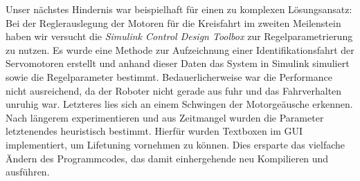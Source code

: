 \documentclass[12pt,a4paper,oneside]{article}
\begin{document}
\begin{spacing}{1.15}
	Unser nächstes Hindernis war beispielhaft für einen zu komplexen Lösungsansatz: Bei der Reglerauslegung der Motoren für die Kreisfahrt im zweiten Meilenstein haben wir versucht die \textit{Simulink Control Design Toolbox} zur Regelparametrierung zu nutzen. Es wurde eine Methode zur Aufzeichnung einer Identifikationsfahrt der Servomotoren erstellt und anhand dieser Daten das System in Simulink simuliert sowie die Regelparameter bestimmt. Bedauerlicherweise war die Performance nicht ausreichend, da der Roboter nicht gerade aus fuhr und das Fahrverhalten unruhig war. Letzteres lies sich an einem Schwingen der Motorgeäusche erkennen. Nach längerem experimentieren und aus Zeitmangel wurden die Parameter letztenendes heuristisch bestimmt. Hierfür wurden Textboxen im GUI implementiert, um Lifetuning vornehmen zu können. Dies ersparte das vielfache Ändern des Programmcodes, das damit einhergehende neu Kompilieren und ausführen.  
	

\end{spacing}
\end{document}
